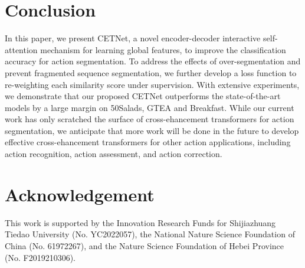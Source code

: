 \documentclass[runningheads]{llncs}
\begin{document}
\section{Conclusion}
\par{
	In this paper, we present CETNet, a novel encoder-decoder interactive self-attention mechanism for learning global features, to improve the classification accuracy for action segmentation. To address the effects of over-segmentation and prevent fragmented sequence segmentation, we further develop a loss function to re-weighting each similarity score under supervision. With extensive experiments, we demonstrate that our proposed CETNet outperforms the state-of-the-art models by a large margin on 50Salads, GTEA and Breakfast. While our current work has only scratched the surface of cross-ehancement transformers for action segmentation, we anticipate that more work will be done in the future to develop effective cross-ehancement transformers for other action applications, including action recognition, action assessment, and action correction.
}










\section*{Acknowledgement}
This work is supported by the Innovation Research  Funds for Shijiazhuang Tiedao University (No. YC2022057), the National Nature Science Foundation of China (No. 61972267), and the Nature Science Foundation of Hebei Province (No. F2019210306).


\clearpage



\end{document}
